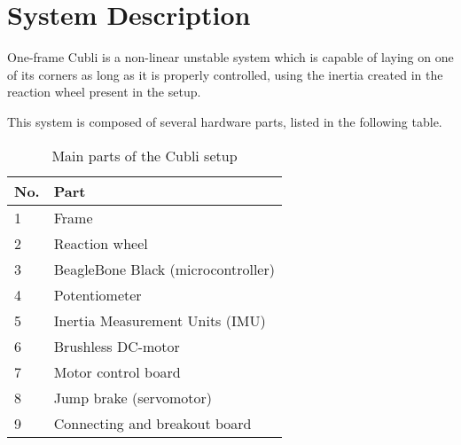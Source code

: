 \chapter{System Description}\label{systemDescription}
One-frame Cubli is a non-linear unstable system which is capable of laying on one of its corners as long as it is properly controlled, using the inertia created in the reaction wheel present in the setup.



This system is composed of several hardware parts, listed in the following table. 

\begin{table}[H]
	\begin{tabular}{|l|p{6.7cm}|}
		\hline %
		\textbf{No.} &\textbf{Part} 			\\
		\hline %
		1            & Frame           			\\
		\hline %
		2            & Reaction wheel      		\\
		\hline %
		3            & BeagleBone Black (microcontroller)  \\
		\hline %
		4            & Potentiometer			\\
		\hline %
		5            & Inertia Measurement Units (IMU)       			\\
		\hline %
		6            & Brushless DC-motor   	\\
		\hline %
		7            & Motor control board     	\\
		\hline %
		8            & Jump brake (servomotor)		    	\\
		\hline %
		9            & Connecting and breakout board		    	\\
		\hline %
	\end{tabular}
	\caption{Main parts of the Cubli setup}
\label{TableAAUCubliComponent}
\end{table}

